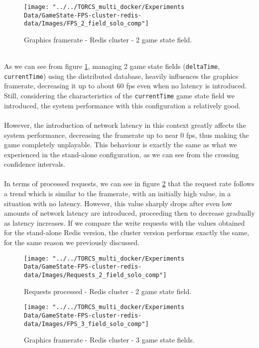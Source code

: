 \begin{figure}[h!]
	\centering
	\texttt{[image: "../../TORCS\_multi\_docker/Experiments Data/GameState-FPS-cluster-redis-data/Images/FPS\_2\_field\_solo\_comp"]}
	\caption[Graphics framerate - Redis cluster - 2 game state field]{Graphics framerate - Redis cluster - 2 game state field.}
	\label{fig:fps-2-field-redis-cluster}
\end{figure}
\\ As we can see from figure \ref{fig:fps-2-field-redis-cluster}, managing 2 game state fields (\texttt{deltaTime}, \texttt{currentTime}) using the distributed database, heavily influences the graphics framerate, decreasing it up to about 60 fps even when no latency is introduced. Still, considering the characteristics of the \texttt{currentTime} game state field we introduced, the system performance with this configuration a relatively good. \\ \\
However, the introduction of network latency in this context greatly affects the system performance, decreasing the framerate up to near 0 fps, thus making the game completely unplayable. This behaviour is exactly the same as what we experienced in the stand-alone configuration, as we can see from the crossing confidence intervals. \\ \\
In terms of processed requests, we can see in figure \ref{fig:requests-2-field-redis-cluster} that the request rate follows a trend which is similar to the framerate, with an initially high value, in a situation with no latency. However, this value sharply drops after even low amounts of network latency are introduced, proceeding then to decrease gradually as latency increases. If we compare the write requests with the values obtained for the stand-alone Redis version, the cluster version performs exactly the same, for the same reason we previously discussed. \\
\begin{figure}[h!]
	\centering
	\texttt{[image: "../../TORCS\_multi\_docker/Experiments Data/GameState-FPS-cluster-redis-data/Images/Requests\_2\_field\_solo\_comp"]}
	\caption[Requests processed - Redis cluster - 2 game state field]{Requests processed - Redis cluster - 2 game state field.}
	\label{fig:requests-2-field-redis-cluster}
\end{figure}
\begin{figure}[h!]
	\centering
	\texttt{[image: "../../TORCS\_multi\_docker/Experiments Data/GameState-FPS-cluster-redis-data/Images/FPS\_3\_field\_solo\_comp"]}
	\caption[Graphics framerate - Redis cluster - 3 game state fields]{Graphics framerate - Redis cluster - 3 game state fields.}
	\label{fig:fps-3-field-redis-cluster}
\end{figure}
